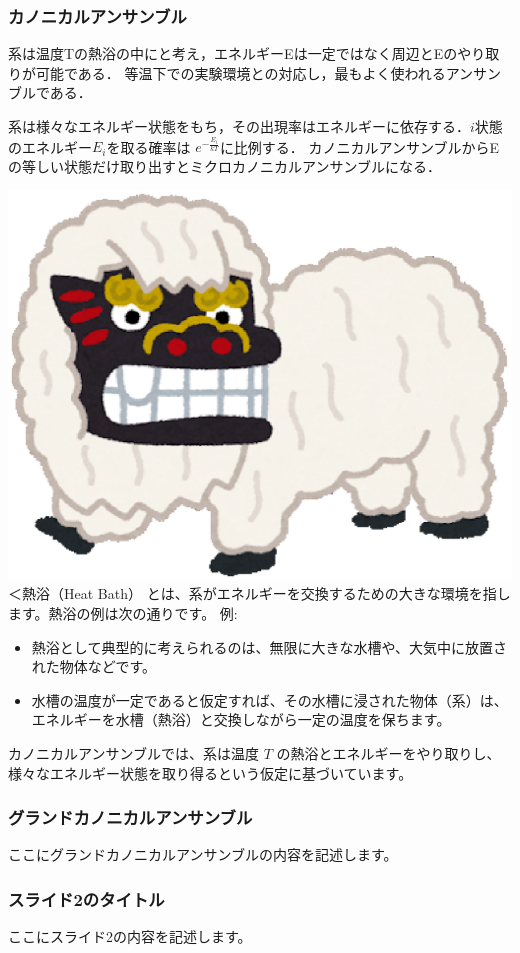 \documentclass{beamer}
\newcommand{\shishimai}[1][0.1\textwidth]{%
  \includegraphics[width=#1 cm]{fig/okinawa_shishimai.eps}
}
\begin{document}
\begin{frame}
  \frametitle{カノニカルアンサンブル}
  系は温度Tの熱浴の中にと考え，エネルギーEは一定ではなく周辺とEのやり取りが可能である．
  等温下での実験環境との対応し，最もよく使われるアンサンブルである．

  系は様々なエネルギー状態をもち，その出現率はエネルギーに依存する．$i$状態のエネルギー$E_i$を取る確率は
  $ e^{-\frac{E_i}{kT}} $に比例する．
  \newline
  カノニカルアンサンブルからEの等しい状態だけ取り出すとミクロカノニカルアンサンブルになる．

  \shishimai[1]＜熱浴（Heat Bath） とは、系がエネルギーを交換するための大きな環境を指します。熱浴の例は次の通りです。
  例:
  \begin{itemize}
      \item 熱浴として典型的に考えられるのは、無限に大きな水槽や、大気中に放置された物体などです。
      \item 水槽の温度が一定であると仮定すれば、その水槽に浸された物体（系）は、エネルギーを水槽（熱浴）と交換しながら一定の温度を保ちます。
  \end{itemize}
  カノニカルアンサンブルでは、系は温度 \( T \) の熱浴とエネルギーをやり取りし、様々なエネルギー状態を取り得るという仮定に基づいています。

\end{frame}

\begin{frame}
  \frametitle{グランドカノニカルアンサンブル}
  ここにグランドカノニカルアンサンブルの内容を記述します。
\end{frame}

\begin{frame}
  \frametitle{スライド2のタイトル}
  ここにスライド2の内容を記述します。
\end{frame}
\end{document}
